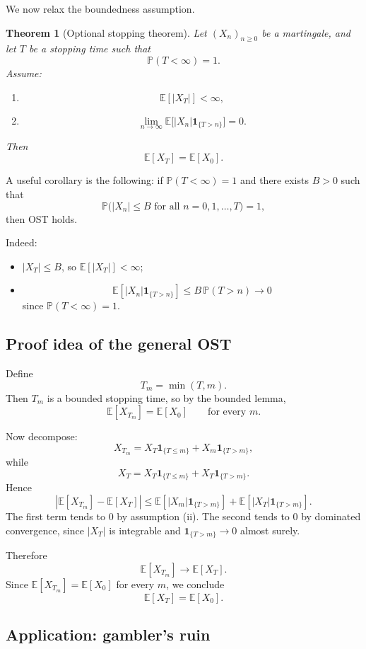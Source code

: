 \documentclass[11pt]{article}
\newtheorem{theorem}{Theorem}[section]
\theoremstyle{definition}
\begin{document}
We now relax the boundedness assumption.

\begin{theorem}[Optional stopping theorem]
Let \((X_n)_{n\ge 0}\) be a martingale, and let \(T\) be a stopping time such that
\[
\mathbb P(T<\infty)=1.
\]
Assume:
\begin{enumerate}[label=(\roman*)]
    \item
    \[
    \mathbb E[|X_T|]<\infty,
    \]
    \item
    \[
    \lim_{n\to\infty}\mathbb E\big[|X_n|\mathbf 1_{\{T>n\}}\big]=0.
    \]
\end{enumerate}
Then
\[
\mathbb E[X_T]=\mathbb E[X_0].
\]
\end{theorem}

A useful corollary is the following: if \(\mathbb P(T<\infty)=1\) and there exists \(B>0\) such that
\[
\mathbb P\big(|X_n|\le B \text{ for all } n=0,1,\dots,T\big)=1,
\]
then OST holds.

Indeed:
\begin{itemize}[leftmargin=2em]
    \item \(|X_T|\le B\), so \(\mathbb E[|X_T|]<\infty\);
    \item
    \[
    \mathbb E[|X_n|\mathbf 1_{\{T>n\}}]\le B\,\mathbb P(T>n)\to 0
    \]
    since \(\mathbb P(T<\infty)=1\).
\end{itemize}

\subsection{Proof idea of the general OST}

Define
\[
T_m=\min(T,m).
\]
Then \(T_m\) is a bounded stopping time, so by the bounded lemma,
\[
\mathbb E[X_{T_m}]=\mathbb E[X_0]
\qquad \text{for every } m.
\]

Now decompose:
\[
X_{T_m}=X_T\mathbf 1_{\{T\le m\}}+X_m\mathbf 1_{\{T>m\}},
\]
while
\[
X_T=X_T\mathbf 1_{\{T\le m\}}+X_T\mathbf 1_{\{T>m\}}.
\]
Hence
\[
|\mathbb E[X_{T_m}]-\mathbb E[X_T]|
\le
\mathbb E[|X_m|\mathbf 1_{\{T>m\}}]
+
\mathbb E[|X_T|\mathbf 1_{\{T>m\}}].
\]
The first term tends to \(0\) by assumption (ii). The second tends to \(0\) by dominated convergence, since \(|X_T|\) is integrable and \(\mathbf 1_{\{T>m\}}\to 0\) almost surely.

Therefore
\[
\mathbb E[X_{T_m}]\to \mathbb E[X_T].
\]
Since \(\mathbb E[X_{T_m}]=\mathbb E[X_0]\) for every \(m\), we conclude
\[
\mathbb E[X_T]=\mathbb E[X_0].
\]

\subsection{Application: gambler's ruin}
\end{document}
